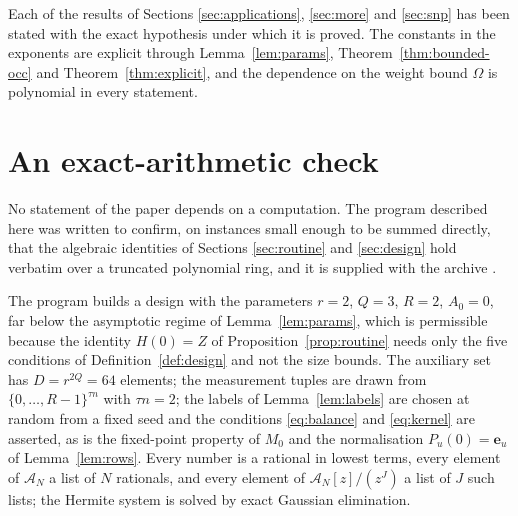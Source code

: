 \documentclass[11pt,reqno]{amsart}
\numberwithin{equation}{section}
\theoremstyle{plain}
\theoremstyle{definition}
\theoremstyle{remark}
\newcommand{\A}{\mathcal{A}}
\newcommand{\e}{\mathbf{e}}
\begin{document}
Each of the results of Sections \ref{sec:applications}, \ref{sec:more} and \ref{sec:snp} has
been stated with the exact hypothesis under which it is proved. The constants
in the exponents are explicit through Lemma~\ref{lem:params},
Theorem~\ref{thm:bounded-occ} and Theorem~\ref{thm:explicit}, and the dependence on the weight bound $\Omega$
is polynomial in every statement.

\appendix
\section{An exact-arithmetic check}\label{app:check}

No statement of the paper depends on a computation. The program described here
was written to confirm, on instances small enough to be summed directly, that
the algebraic identities of Sections \ref{sec:routine} and \ref{sec:design}
hold verbatim over a truncated polynomial ring, and it is supplied with the
archive \cite{Bha26arch}.

The program builds a design with the parameters $r=2$, $Q=3$, $R=2$, $A_0=0$,
far below the asymptotic regime of Lemma~\ref{lem:params}, which is
permissible because the identity $H(0)=Z$ of Proposition~\ref{prop:routine}
needs only the five conditions of Definition~\ref{def:design} and not the size
bounds. The auxiliary set has $D=r^{2Q}=64$ elements; the measurement tuples
are drawn from $\{0,\dots,R-1\}^{\tau n}$ with $\tau n=2$; the labels of
Lemma~\ref{lem:labels} are chosen at random from a fixed seed and the
conditions \eqref{eq:balance} and \eqref{eq:kernel} are asserted, as is the
fixed-point property of $M_0$ and the normalisation $P_u(0)=\e_u$ of
Lemma~\ref{lem:rows}. Every number is a rational in lowest terms, every element
of $\A_N$ a list of $N$ rationals, and every element of $\A_N[z]/(z^{J})$ a list
of $J$ such lists; the Hermite system is solved by exact Gaussian elimination.
\end{document}
